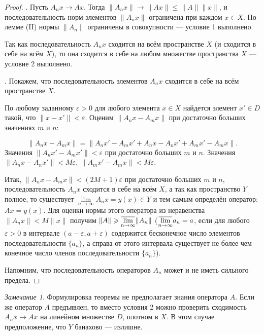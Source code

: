 \documentclass[12pt,a4paper,titlepage,oneside]{book}
\newcommand{\overbar}[1]{\mkern 1.5mu\overline{\mkern-1.5mu#1\mkern-1.5mu}\mkern 1.5mu}
\theoremstyle{definition}
\theoremstyle{plain}
\theoremstyle{break}
\theoremstyle{remark}
\newtheorem*{remark}{Замечание}
\theoremstyle{remark}
\theoremstyle{remark}
\theoremstyle{remark}
\theoremstyle{plain}
\theoremstyle{plain}
\begin{document}
\begin{proof}
. Пусть $A_n x \to A x$. Тогда $\lVert A_n x\rVert \to \lVert A x\rVert \leqslant \lVert A\rVert \lVert x\rVert$, и последовательность норм элементов $\lVert A_n x\rVert$ ограничена при каждом $x \in X$. По лемме (II) нормы $\lVert A_n\rVert$ ограничены в совокупности --- условие 1 выполнено.

Так как последовательность $A_n x$ сходится на всём пространстве $X$ (и сходится в себе на всём $X$), то она сходится в себе на любом множестве пространства $X$ --- условие 2 выполнено.

. Покажем, что последовательность элементов $A_n x$ сходится в себе на всём пространстве $X$.

По любому заданному $\varepsilon > 0$ для любого элемента $x \in X$ найдется элемент $x' \in D$ такой, что $\lVert x - x'\rVert < \varepsilon$. Оценим $\lVert A_n x - A_m x\rVert$ при достаточно больших значениях $m$ и $n$:

$$\lVert A_n x - A_m x\rVert = \lVert A_n x' - A_m x' + A_n x - A_n x' + A_m x' - A_m x\rVert.$$
Значения $\lVert A_n x' - A_m x'\rVert < \varepsilon$ при достаточно больших $m$ и $n$.
Значения $\lVert A_n x - A_n x'\rVert < M\varepsilon$, $\lVert A_m x' - A_m x\rVert < M\varepsilon$.

Итак, $\lVert A_n x - A_m x\rVert < (2M +1)\varepsilon$ при достаточно больших $m$ и $n$, последовательность $A_n x$ сходится в себе на всём $X$, а так как пространство $Y$ полное, то существует $\lim\limits_{n \to \infty} A_n x = y(x) \in Y$ и тем самым определён оператор: $A x = y(x)$. Для оценки нормы этого оператора из неравенства $\lVert A_n x\rVert < M\lVert x\rVert$ получим $\lVert A\rVert \geqslant \overbar{\lim\limits_{n \to \infty}}\lVert A_n\rVert$ ($\overbar{\lim\limits_{n \to \infty}}a_n = a$, если для любого $\varepsilon > 0$ в интервале $(a-\varepsilon, a+\varepsilon)$ содержится бесконечное число элементов последовательности $\lbrace a_n\rbrace$, а справа от этого интервала существует не более чем конечное число членов последовательности $\lbrace a_n\rbrace$).

Напомним, что последовательность операторов $A_n$ может и не иметь сильного предела.
\end{proof}

\begin{remark}
Формулировка теоремы не предполагает знания оператора $A$. Если же оператор $A$ предъявлен, то вместо условия 2 можно проверить сходимость $A_n x\to A x$ на линейном множестве $D$, плотном в $X$. В этом случае предположение, что $Y$ банахово --- излишне.
\end{remark}
\end{document}
